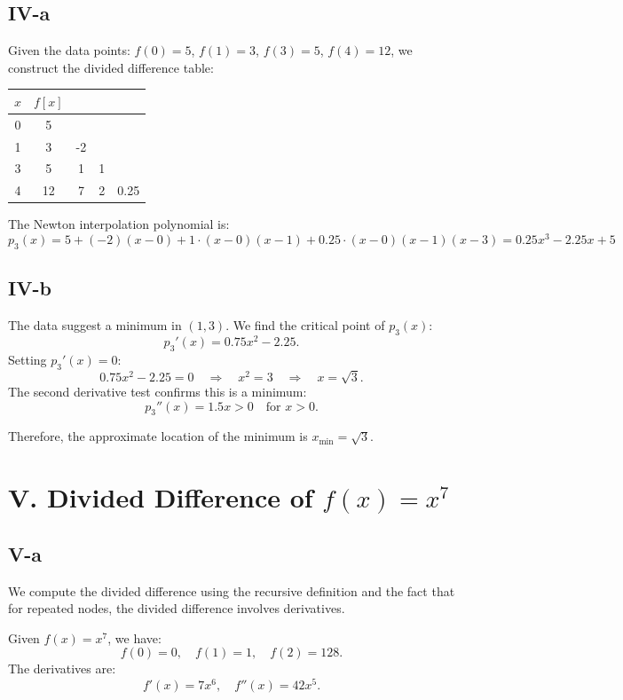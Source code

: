 \documentclass[a4paper]{article}
\begin{document}
\subsection*{IV-a}

Given the data points: \( f(0) = 5 \), \( f(1) = 3 \), \( f(3) = 5 \), \( f(4) = 12 \), we construct the divided difference table:

\begin{center}
\begin{tabular}{c|cccc}
$x$ & $f[x]$ &  & &  \\
\hline
0 & 5 \\
1 & 3 & -2 \\
3 & 5 & 1 & 1 \\
4 & 12 & 7 & 2 & 0.25 \\
\end{tabular}
\end{center}

The Newton interpolation polynomial is:
\[
p_3(x) = 5 + (-2)(x-0) + 1 \cdot (x-0)(x-1) + 0.25 \cdot (x-0)(x-1)(x-3) = 0.25x^3 - 2.25x + 5
\]

\subsection*{IV-b}

The data suggest a minimum in \( (1, 3) \). We find the critical point of \( p_3(x) \):
\[
p_3'(x) = 0.75x^2 - 2.25.
\]
Setting \( p_3'(x) = 0 \):
\[
0.75x^2 - 2.25 = 0 \quad \Rightarrow \quad x^2 = 3 \quad \Rightarrow \quad x = \sqrt{3}.
\]
The second derivative test confirms this is a minimum:
\[
p_3''(x) = 1.5x > 0 \quad \text{for } x > 0.
\]

Therefore, the approximate location of the minimum is \( x_{\min} = \sqrt{3}\).

\section*{V. Divided Difference of \( f(x) = x^7 \)}

\subsection*{V-a}

We compute the divided difference using the recursive definition and the fact that for repeated nodes, the divided difference involves derivatives.

Given \( f(x) = x^7 \), we have:
\[
f(0) = 0, \quad f(1) = 1, \quad f(2) = 128.
\]
The derivatives are:
\[
f'(x) = 7x^6, \quad f''(x) = 42x^5.
\]
\end{document}
